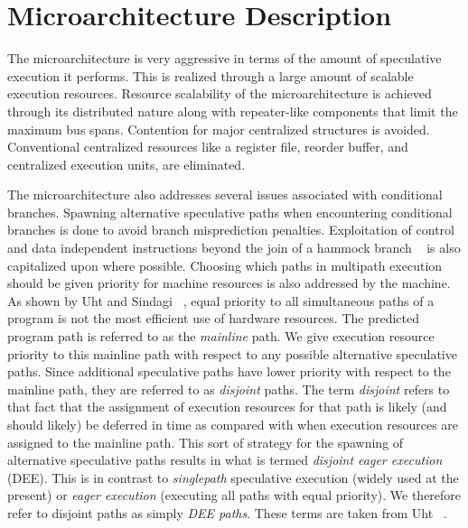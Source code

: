 \documentclass[10pt,twocolumn,dvips]{article}
\begin{document}
\section{Microarchitecture Description}
%
The microarchitecture is very aggressive in terms of
the amount of speculative execution it performs.
This is realized through a large amount of scalable execution
resources.
Resource scalability
of the microarchitecture is achieved through its distributed nature
along with repeater-like components that limit the maximum bus
spans.
Contention for major centralized structures is avoided.
Conventional centralized resources like a register file,
reorder buffer, and centralized execution units, are eliminated.

The microarchitecture also 
addresses several issues associated with conditional branches.
Spawning alternative speculative paths when encountering conditional
branches is done to avoid branch misprediction penalties.
Exploitation of control
and data independent instructions beyond the join of a 
hammock branch ~\cite{Fer87}
is also capitalized upon where possible.
Choosing which paths in multipath execution should
be given priority for machine resources is also addressed
by the machine.
As shown by Uht and Sindagi ~\cite{Uht95},
equal priority to all simultaneous paths
of a program is not the most efficient use of hardware resources.
The predicted program path is referred to as the \textit{mainline} path.  
We give execution resource priority to this mainline path with respect
to any possible alternative speculative paths.  
Since additional speculative paths have lower priority with
respect to the mainline path, they are referred
to as \textit{disjoint} paths.  
The term \textit{disjoint} refers to that fact that the assignment
of execution resources for that path is likely (and should likely) be
deferred in time
as compared with when execution resources are assigned to the mainline
path.  This sort of strategy for the spawning of alternative speculative
paths results in what is termed \textit{disjoint eager execution} (DEE).
This is in contrast to \textit{singlepath} speculative execution
(widely used at the present)
or \textit{eager execution} (executing all paths with equal priority).
We therefore refer to disjoint paths as simply \textit{DEE paths}.
These terms are taken from Uht ~\cite{Uht95}.
%
%
\end{document}
